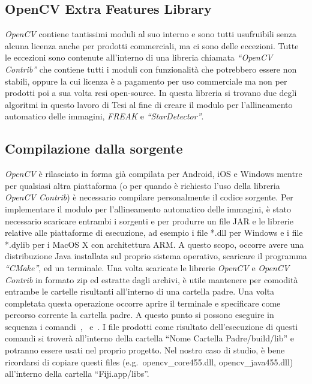 \subsection{OpenCV Extra Features Library}
\noindent \textit{OpenCV} contiene tantissimi moduli al suo interno e sono tutti usufruibili senza alcuna licenza anche per prodotti commerciali, ma ci sono delle eccezioni. Tutte le eccezioni sono contenute all'interno di una libreria chiamata \textit{``OpenCV Contrib''} che contiene tutti i moduli con funzionalità che potrebbero essere non stabili, oppure la cui licenza è a pagamento per uso commerciale ma non per prodotti poi a sua volta resi open-source. In questa libreria si trovano due degli algoritmi in questo lavoro di Tesi al fine di creare il modulo per l'allineamento automatico delle immagini, \textit{FREAK} e \textit{``StarDetector''}.

\subsection{Compilazione dalla sorgente}
\noindent \textit{OpenCV} è rilasciato in forma già compilata per Android, iOS e Windows mentre per qualsiasi altra piattaforma (o per quando è richiesto l'uso della libreria \textit{OpenCV Contrib}) è necessario compilare personalmente il codice sorgente. Per implementare il modulo per l'allineamento automatico delle immagini, è stato necessario scaricare entrambi i sorgenti e per produrre un file JAR e le librerie relative alle piattaforme di esecuzione, ad esempio i file *.dll per Windows e i file *.dylib per i MacOS X con architettura ARM\@.
A questo scopo, occorre avere una distribuzione Java installata sul proprio sistema operativo, scaricare il programma \textit{``CMake''}, ed un terminale. Una volta scaricate le librerie \textit{OpenCV} e \textit{OpenCV Contrib} in formato zip ed estratte dagli archivi, è utile mantenere per comodità entrambe le cartelle risultanti all'interno di una cartella padre. Una volta completata questa operazione occorre aprire il terminale e specificare come percorso corrente la cartella padre. A questo punto si possono eseguire in sequenza i comandi~,~ e~. I file prodotti come risultato dell'esecuzione di questi comandi si troverà all'interno della cartella ``{Nome Cartella Padre}/build/lib'' e potranno essere usati nel proprio progetto. Nel nostro caso di studio, è bene ricordarsi di copiare questi files (e.g.\ opencv\_core455.dll, opencv\_java455.dll) all'interno della cartella ``Fiji.app/libs''.

